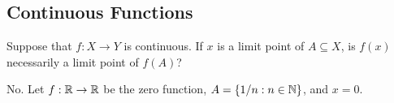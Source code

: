 




\subsection{Continuous Functions}

	\begin{exercise}
		Suppose that $f:X\to Y$ is continuous. If $x$ is a limit point of $A\subseteq X$, is $f(x)$ necessarily a limit point of $f(A)$?
	\end{exercise}
	\begin{solution*}
		No. Let $f:\mathbb{R}\to\mathbb{R}$ be the zero function, $A=\{1/n : n\in\mathbb{N}\}$, and $x=0$.
	\end{solution*}

